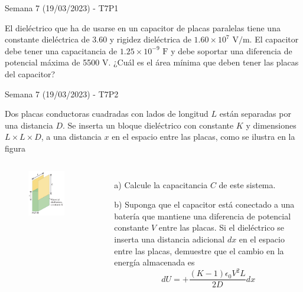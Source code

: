 \begin{frame}{Semana 7 (19/03/2023) - T7P1}

    El dieléctrico que ha de usarse en un capacitor de placas paralelas tiene una constante dieléctrica de 3.60 y rigidez dieléctrica de $1.60\times10^7 \text{ V}/\text{m}$. El capacitor debe tener una capacitancia de $1.25\times10^{-9} \text{ F}$ y debe soportar una diferencia de potencial máxima de 5500 V. ¿Cuál es el área mínima que deben tener las placas del capacitor?
\end{frame}

\begin{frame}{Semana 7 (19/03/2023) - T7P2}

    Dos placas conductoras cuadradas con lados de longitud $L$ están separadas por una distancia $D$. Se inserta un bloque dieléctrico con constante $K$ y dimensiones $L \times L \times D$, a una distancia $x$ en el espacio entre las placas, como se ilustra en la figura

    \begin{columns}
        \begin{figure}[H]
        \centering
        \includegraphics[scale=0.4]{figures/t7p2.png}
    \end{figure}
    \begin{itemize}
        \item[a)] Calcule la capacitancia $C$ de este sistema.
        \item[b)] Suponga que el capacitor está conectado a una batería que mantiene una diferencia de potencial constante $V$ entre las placas. Si el dieléctrico se inserta una distancia adicional $dx$ en el espacio entre las placas, demuestre que el cambio en la energía almacenada es $$dU=+\frac{(K-1)\epsilon_0V^2L}{2D}dx$$
    \end{itemize}
    \end{columns}
    
    
\end{frame}

